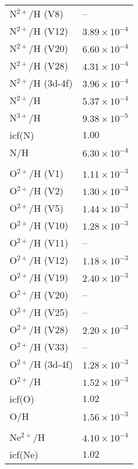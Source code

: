 \begin{longtable}[l]{ll}
 N$^{2+}$/H (V8)                     & -- \\
 N$^{2+}$/H (V12)                    & $  3.89\times 10^{ -4}$\\
 N$^{2+}$/H (V20)                    & $  6.60\times 10^{ -4}$\\
 N$^{2+}$/H (V28)                    & $  4.31\times 10^{ -4}$\\
 N$^{2+}$/H (3d-4f)                  & $  3.96\times 10^{ -4}$\\
 N$^{2+}$/H                          & $  5.37\times 10^{ -4}$\\
 N$^{3+}$/H                          & $  9.38\times 10^{ -5}$\\
 icf(N)                              & $  1.00$\\
 N/H                                 & $  6.30\times 10^{ -4}$\\
 \\
 O$^{2+}$/H (V1)                     & $  1.11\times 10^{ -3}$\\
 O$^{2+}$/H (V2)                     & $  1.30\times 10^{ -3}$\\
 O$^{2+}$/H (V5)                     & $  1.44\times 10^{ -3}$\\
 O$^{2+}$/H (V10)                    & $  1.28\times 10^{ -3}$\\
 O$^{2+}$/H (V11)                    & -- \\
 O$^{2+}$/H (V12)                    & $  1.18\times 10^{ -3}$\\
 O$^{2+}$/H (V19)                    & $  2.40\times 10^{ -3}$\\
 O$^{2+}$/H (V20)                    & -- \\
 O$^{2+}$/H (V25)                    & -- \\
 O$^{2+}$/H (V28)                    & $  2.20\times 10^{ -3}$\\
 O$^{2+}$/H (V33)                    & -- \\
 O$^{2+}$/H (3d-4f)                  & $  1.28\times 10^{ -3}$\\
 O$^{2+}$/H                          & $  1.52\times 10^{ -3}$\\
 icf(O)                              & $  1.02$\\
 O/H                                 & $  1.56\times 10^{ -3}$\\
 \\
 Ne$^{2+}$/H                         & $  4.10\times 10^{ -4}$\\
 icf(Ne)                             & $  1.02$\\

\end{longtable}
